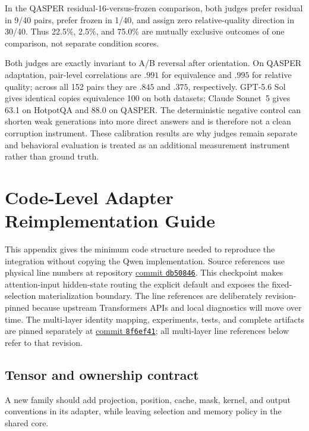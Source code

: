 \documentclass[11pt]{article}
\begin{document}
In the QASPER residual-16-versus-frozen comparison, both judges prefer residual in 9/40 pairs,
prefer frozen in 1/40, and assign zero relative-quality direction in 30/40. Thus 22.5\%, 2.5\%,
and 75.0\% are mutually exclusive outcomes of one comparison, not separate condition scores.

Both judges are exactly invariant to A/B reversal after orientation. On QASPER adaptation,
pair-level correlations are $.991$ for equivalence and $.995$ for relative quality; across all
152 pairs they are $.845$ and $.375$, respectively. GPT-5.6 Sol gives identical copies
equivalence 100 on both datasets; Claude Sonnet~5 gives 63.1 on HotpotQA and 88.0 on QASPER.
The deterministic negative control can shorten weak generations into more direct answers and is
therefore not a clean corruption instrument. These calibration results are why judges remain
separate and behavioral evaluation is treated as an additional measurement instrument rather
than ground truth.

\section{Code-Level Adapter Reimplementation Guide}
\label{app:adapter-guide}

This appendix gives the minimum code structure needed to reproduce the integration without
copying the Qwen implementation. Source references use physical line numbers at repository
\href{https://github.com/einnovator/pdattention/tree/db508461f8702630ad6d3d6f250bd075ba5cbc2d}{commit
\texttt{db50846}}. This checkpoint makes attention-input hidden-state routing the explicit
default and exposes the fixed-selection materialization boundary.
The line references are deliberately revision-pinned because upstream
Transformers APIs and local diagnostics will move over time.
The multi-layer identity mapping, experiments, tests, and complete artifacts are pinned
separately at
\href{https://github.com/einnovator/pdattention/tree/8f6ef41}{commit \texttt{8f6ef41}};
all multi-layer line references below refer to that revision.

\subsection{Tensor and ownership contract}

A new family should add projection, position, cache, mask, kernel, and output conventions in its
adapter, while leaving selection and memory policy in the shared core.
\end{document}
